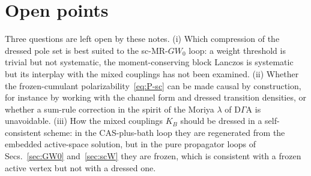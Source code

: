 \documentclass[11pt,a4paper]{article}
\newcommand{\DGA}{D$\Gamma$A}
\begin{document}
\section{Open points}

Three questions are left open by these notes.  (i) Which compression of the
dressed pole set is best suited to the sc-MR-$GW_0$ loop: a weight threshold
is trivial but not systematic, the moment-conserving block Lanczos is
systematic but its interplay with the mixed couplings has not been examined.
(ii) Whether the frozen-cumulant polarizability~\eqref{eq:P-sc} can be made
causal by construction, for instance by working with the channel form and
dressed transition densities, or whether a sum-rule correction in the spirit
of the Moriya $\lambda$ of \DGA{} is unavoidable.  (iii) How the mixed
couplings $K_B$ should be dressed in a self-consistent scheme: in the
CAS-plus-bath loop they are regenerated from the embedded active-space
solution, but in the pure propagator loops of Secs.~\ref{sec:GW0}
and~\ref{sec:scW} they are frozen, which is consistent with a frozen active
vertex but not with a dressed one.
\end{document}

